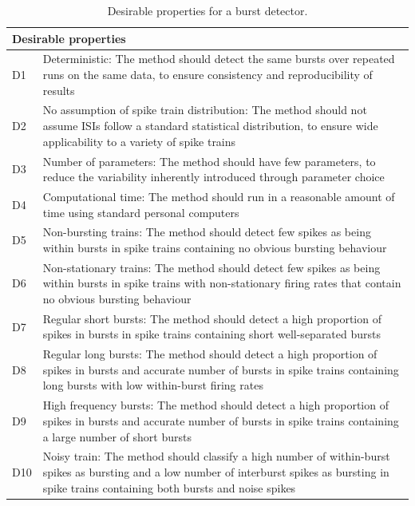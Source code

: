 \documentclass[12pt, titlepage]{article}
\begin{document}
			\begin{table}[h] \centering 	
				\begin{tabular}{|l|m{13cm}|}
					\hline \multicolumn{2}{|l|}{Desirable properties}
					\\ \hline
					D1 & Deterministic: The method should detect the same bursts over repeated runs on the same  data, to ensure consistency and reproducibility of results
					\\ \hline D2 & No assumption of spike train distribution: The method should not assume ISIs follow a standard statistical  
					distribution, to ensure wide applicability to a variety of spike trains
					\\ \hline  D3 & Number of parameters: The method should have few parameters, to reduce the variability inherently introduced through parameter choice
					\\\hline D4 & Computational time: The method should run in a reasonable amount of time using standard personal computers
					\\ \hline D5 & Non-bursting trains: The method should detect few spikes as being within bursts in spike trains containing no obvious bursting behaviour
					\\\hline D6 & Non-stationary trains: The method should detect few spikes as being within bursts in spike trains with non-stationary firing rates that contain no obvious bursting behaviour 
					\\ \hline D7 & Regular short bursts: The method should detect a high proportion of spikes in bursts in spike trains containing short well-separated bursts
					\\\hline D8 & Regular long bursts: The method should detect a high proportion of spikes in bursts and accurate  number of bursts in spike trains containing long bursts with low within-burst firing rates
					\\ \hline  D9 & High frequency bursts: The method should detect a high proportion of spikes in bursts and accurate number of bursts in spike trains containing a large number of short bursts
					\\\hline D10 & Noisy train: The method should classify a high number of within-burst spikes as bursting and a low number of interburst spikes as bursting in spike trains containing both bursts and noise spikes
					\\ \hline
				\end{tabular} \caption{Desirable properties for a burst detector.}
				\label{des_prop}
			\end{table}
\end{document}
